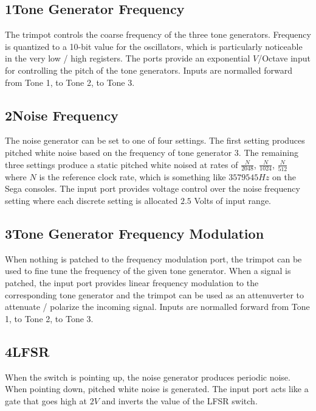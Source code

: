 \documentclass[12pt,letter]{article}
\begin{document}
\subsection*{1{\quad}Tone Generator Frequency}

The trimpot controls the coarse frequency of the three tone generators. Frequency is quantized to a 10-bit value for the oscillators, which is particularly noticeable in the very low / high registers. The ports provide an exponential $V$/Octave input for controlling the pitch of the tone generators. Inputs are normalled forward from Tone 1, to Tone 2, to Tone 3.

\subsection*{2{\quad}Noise Frequency}

The noise generator can be set to one of four settings. The first setting produces pitched white noise based on the frequency of tone generator 3. The remaining three settings produce a static pitched white noised at rates of $\frac{N}{2048}$, $\frac{N}{1024}$, $\frac{N}{512}$ where $N$ is the reference clock rate, which is something like $3579545Hz$ on the Sega consoles. The input port provides voltage control over the noise frequency setting where each discrete setting is allocated $2.5$ Volts of input range.

\clearpage
\subsection*{3{\quad}Tone Generator Frequency Modulation}

When nothing is patched to the frequency modulation port, the trimpot can be used to fine tune the frequency of the given tone generator. When a signal is patched, the input port provides linear frequency modulation to the corresponding tone generator and the trimpot can be used as an attenuverter to attenuate / polarize the incoming signal. Inputs are normalled forward from Tone 1, to Tone 2, to Tone 3.

\subsection*{4{\quad}LFSR}

When the switch is pointing up, the noise generator produces periodic noise. When pointing down, pitched white noise is generated. The input port acts like a gate that goes high at $2V$ and inverts the value of the LFSR switch.
\end{document}
